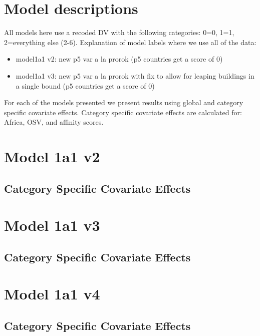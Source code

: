 \documentclass[]{article}
\begin{document}
\tableofcontents

\clearpage

\section*{Model descriptions}

All models here use a recoded DV with the following categories: 0=0, 1=1, 2=everything else (2-6). Explanation of model labels where we use all of the data:

\begin{itemize}
	\item model1a1 v2: new p5 var a la prorok (p5 countries get a score of 0)
	\item model1a1 v3: new p5 var a la prorok with fix to allow for leaping buildings in a single bound (p5 countries get a score of 0)
\end{itemize}

For each of the models presented we present results using global and category specific covariate effects. Category specific covariate effects are calculated for: Africa, OSV, and affinity scores.
\clearpage

\section{Model 1a1 v2}
\subsection{Category Specific Covariate Effects}

\clearpage

\section{Model 1a1 v3}
\subsection{Category Specific Covariate Effects}

\clearpage

\section{Model 1a1 v4}
\subsection{Category Specific Covariate Effects}

\clearpage
\end{document}
